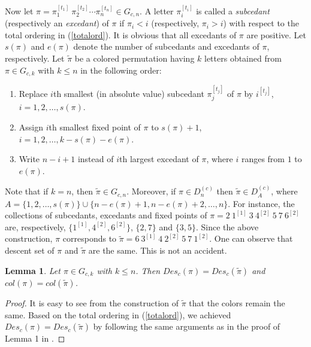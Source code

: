 \documentclass[a4paper,12pt]{article}
\newtheorem{lem}[thm]{Lemma}
\begin{document}
Now let $\pi=\pi_1^{[t_1]} ~\pi_2^{[t_2]} \cdots  \pi_n^{[t_n]} \in G_{c,n}$. A letter $\pi_i^{[t_i]}$ is called a \textit{subcedant} (respectively an \textit{excedant}) of $\pi$ if $\pi_i<i$ (respectively, $\pi_i>i$) with respect to the total ordering in (\ref{totalord}). It is obvious that all excedants of $\pi$ are positive. Let $s(\pi)$ and $e(\pi)$ denote the number of subcedants and excedants of $\pi$, respectively. Let $\tilde{\pi}$ be a colored permutation having $k$  letters obtained from $\pi \in G_{c,k}$ with $k \leq n$ in the following order:
\begin{enumerate}
    \item [$\bullet$] Replace $i$th smallest (in absolute value) subcedant  $\pi_j^{[t_j]}$ of $\pi$ by $i^{[t_j]}$,~$i=1,2,\ldots,s(\pi)$.
    \item [$\bullet$] Assign $i$th smallest fixed point of $\pi$ to $s(\pi)+1$,~~$i=1,2,\ldots,k-s(\pi)-e(\pi)$.
    \item [$\bullet$] Write $n-i+1$ instead of $i$th largest excedant of $\pi$, where $i$ ranges from $1$ to $e(\pi)$.
\end{enumerate}
Note that if $k=n$, then $\tilde{\pi} \in G_{c,n}$. Moreover, if $\pi \in D_{n}^{(c)}$ then $\tilde{\pi} \in D_{A}^{(c)}$, where $A=\{1,2,\ldots,s(\pi)\}\cup \{n-e(\pi)+1,n-e(\pi)+2,\ldots,n\}$. For instance, the collections of subcedants, excedants and fixed points of $\pi=2 ~1^{[1]} ~3~4^{[2]}~5~7~6^{[2]}$ are, respectively, $\{1^{[1]}, 4^{[2]}, 6^{[2]}\}$, $\{2, 7\}$ and $\{3,5\}$. Since the above construction, $\pi$ corresponds to $\tilde{\pi}=6~3^{[1]}~4~2^{[2]}~5~7~1^{[2]}$. One can observe that descent set of $\pi$ and $\tilde{\pi}$ are the same. This is not an accident.

\begin{lem}\label{firstlem}
Let $\pi \in G_{c,k}$ with $k \leq n$. Then $Des_c(\pi)=Des_c(\tilde{\pi})$ and $col(\pi)=col(\tilde{\pi})$.
\end{lem}

\begin{proof}
It is easy to see from the construction of $\tilde{\pi}$ that the colors remain the same. Based on the total ordering in (\ref{totalord}), we achieved $Des_c(\pi)=Des_c(\tilde{\pi})$ by following the same arguments as in the proof of Lemma 1 in \cite{wachs1989}.
\end{proof}
\end{document}
